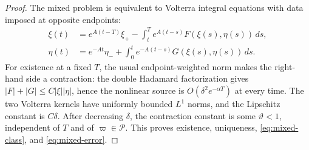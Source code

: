 \documentclass[11pt]{amsart}
\numberwithin{equation}{section}
\theoremstyle{definition}
\theoremstyle{remark}
\begin{document}
\begin{proof}
The mixed problem is equivalent to Volterra integral equations with data
imposed at opposite endpoints:
\begin{align}
 \xi(t)&=e^{A(t-T)}\xi_+
   -\int_t^T e^{A(t-s)}F(\xi(s),\eta(s))\,ds,\label{eq:volterra-xi}\\
 \eta(t)&=e^{-At}\eta_-
   +\int_0^t e^{-A(t-s)}G(\xi(s),\eta(s))\,ds.
   \label{eq:volterra-eta}
\end{align}
For existence at a fixed $T$, the usual endpoint-weighted norm makes the
right-hand side a contraction: the double Hadamard factorization gives
$|F|+|G|\le C|\xi||\eta|$, hence the nonlinear source is
$O(\delta^2e^{-\alpha T})$ at every time.  The two Volterra kernels have
uniformly bounded $L^1$ norms, and the Lipschitz constant is $C\delta$.
After decreasing $\delta$, the contraction constant is some
$\vartheta<1$, independent of $T$ and of $\varpi\in\mathcal P$.  This
proves existence, uniqueness, \eqref{eq:mixed-class}, and
\eqref{eq:mixed-error}.


\end{proof}
\end{document}
